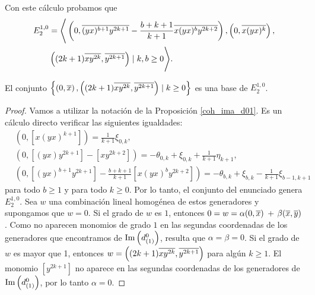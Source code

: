 \documentclass[fleqn,../tesis.tex]{subfiles}
\begin{document}
Con este cálculo probamos que
\begin{align*}
     E^{1,0}_{2} &= \Bigg\langle \left(0, \overline{(yx)^{b + 1}y^{2k + 1}} - \frac{b + k + 1}{k + 1}\overline{x(yx)^{b}y^{2k + 2}}\right),
         \left(0, \overline{x(yx)^{k}}\right),\\
      &\left((2k + 1)\overline{xy^{2k}}, \overline{y^{2k + 1}}\right) \mid k, b \geq 0\Bigg\rangle.
\end{align*}
\begin{prop}
    El conjunto $\left\lbrace\left(0, \overline{x}\right), \left((2k + 1)\overline{xy^{2k}}, \overline{y^{2k + 1}}\right) \mid k\geq 0 \right\rbrace$
    es una base de $E^{1, 0}_2$.
\end{prop}
\begin{proof}
Vamos a utilizar la notación de la Proposición \ref{coh_ima_d01}. Es un cálculo directo verificar las siguientes igualdades:
\begin{align*}
    &\left(0, \left[x(yx)^{k + 1}\right]\right) = \frac{1}{k + 1}\xi_{0, k},\\
    &\left(0, \left[(yx)y^{2k + 1}\right] - \left[xy^{2k + 2}\right]\right) =
    		-\theta_{0, k} + \xi_{0, k} + \frac{1}{k + 1}\eta_{k + 1},\\
    &\left(0, \left[(yx)^{b + 1}y^{2k + 1}\right] - \frac{b +k + 1}{k + 1}\left[x(yx)^{b}y^{2k + 2}\right]\right)
        = -\theta_{b, k} + \xi_{b, k} -\frac{1}{k + 1}\xi_{b - 1, k + 1}
\end{align*}
para todo $b \geq 1$ y para todo $k \geq 0$. Por lo tanto, el conjunto del enunciado genera $E^{1, 0}_2$. Sea $w$
una combinación lineal homogénea de estos generadores y supongamos que $w = 0$. Si el grado de $w$ es $1$, entonces
$0 = w = \alpha (0, \overline{x})$ + $\beta(\overline{x}, \overline{y})$. Como no aparecen monomios de grado $1$ en las segundas coordenadas
de los generadores que encontramos de $\operatorname{Im}\left(d^{0}_{(1)}\right)$, resulta que $\alpha = \beta = 0$. Si el grado
de $w$ es mayor que 1, entonces $w = \left((2k + 1)\overline{xy^{2k}}, \overline{y^{2k + 1}}\right)$ para algún $k \geq 1$. El monomio
$\left[y^{2k + 1}\right]$ no aparece en las segundas coordenadas de los generadores de $\operatorname{Im}\left(d^{0}_{(1)}\right)$, por lo tanto
$\alpha = 0$.
\end{proof}
\end{document}
